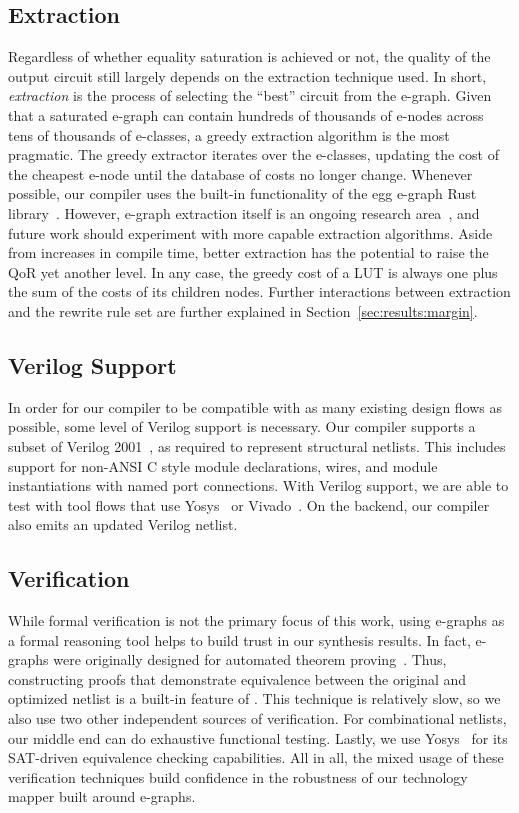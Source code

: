 \subsection{Extraction}\label{sec:flow:extraction}
Regardless of whether equality saturation is achieved or not, the quality of
the output circuit still largely depends on the extraction technique used. In
short, \textit{extraction} is the process of selecting the ``best'' circuit
from the e-graph. Given that a saturated e-graph can contain hundreds of
thousands of e-nodes across tens of thousands of e-classes, a greedy extraction
algorithm is the most pragmatic. The greedy extractor iterates over the
e-classes, updating the cost of the cheapest e-node until the database of costs
no longer change. Whenever possible, our compiler uses the built-in
functionality of the egg e-graph Rust library~\cite{docsEgg}. However, e-graph
extraction itself is an ongoing research area~\cite{smoothe,
    sparsextract,esynth}, and future work should experiment with more capable
extraction algorithms. Aside from increases in compile time, better extraction
has the potential to raise the QoR yet another level. In any case, the greedy
cost of a LUT is always one plus the sum of the costs of its children nodes.
Further interactions between extraction and the rewrite rule set are further
explained in Section~\ref{sec:results:margin}.

\subsection{Verilog Support}\label{sec:flow:verilog}
In order for our compiler to be compatible with as many existing design flows
as possible, some level of Verilog support is necessary. Our compiler supports
a subset of Verilog 2001~\cite{verilog}, as required to represent structural
netlists. This includes support for non-ANSI C style module declarations,
wires, and module instantiations with named port connections. With Verilog
support, we are able to test \shortname{} with tool flows that use
Yosys~\cite{yosys} or Vivado~\cite{vivado}. On the backend, our compiler also
emits an updated Verilog netlist.

\subsection{Verification}\label{sec:flow:verification}
While formal verification is not the primary focus of this work, using e-graphs
as a formal reasoning tool helps to build trust in our synthesis results. In
fact, e-graphs were originally designed for automated theorem
proving~\cite{eggpaper}. Thus, constructing proofs that demonstrate equivalence
between the original and optimized netlist is a built-in feature of
\shortname{}. This technique is relatively slow, so we also use two other
independent sources of verification. For combinational netlists, our middle end
can do exhaustive functional testing. Lastly, we use Yosys~\cite{yosys} for its
SAT-driven equivalence checking capabilities. All in all, the mixed usage of
these verification techniques build confidence in the robustness of our
technology mapper built around e-graphs.